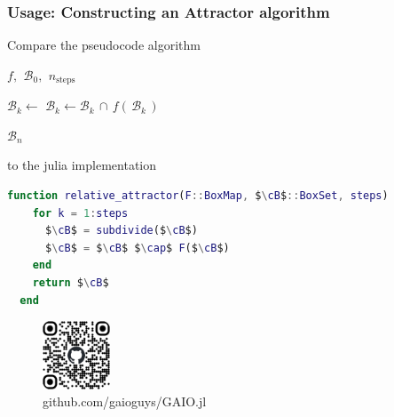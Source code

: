 \documentclass[
  english,            %
  aspectratio=169,    %
]{tumbeamer}
\newcommand{\cB}{\mathcal{B}}
\begin{document}
\begin{frame}[fragile]
\frametitle{Usage: Constructing an Attractor algorithm}


Compare the pseudocode algorithm

\begin{algorithmic}[1]
    \Require $f,\,\ \cB_0,\,\ n_{\text{steps}}$

        \State $\mathcal{B}_k \gets$ 
        \State $\mathcal{B}_k \gets \mathcal{B}_k\, \cap\, f (\,\mathcal{B}_k\,)$
    \EndFor

    \State \Return $\mathcal{B}_n$ 
\end{algorithmic}

to the julia implementation

\begin{lstlisting}[language=Matlab,mathescape]
  function relative_attractor(F::BoxMap, $\cB$::BoxSet, steps)
    for k = 1:steps
      $\cB$ = subdivide($\cB$)
      $\cB$ = $\cB$ $\cap$ F($\cB$)
    end
    return $\cB$
  end
\end{lstlisting}

\end{frame}

\begin{frame}%

\begin{figure}
  \centering
  \includegraphics[width=0.18\textwidth]{qr-code.png}
  {\caption*{github.com/gaioguys/GAIO.jl}}
\end{figure}

\nocite{*}
\printbibliography

\end{frame}
\end{document}
